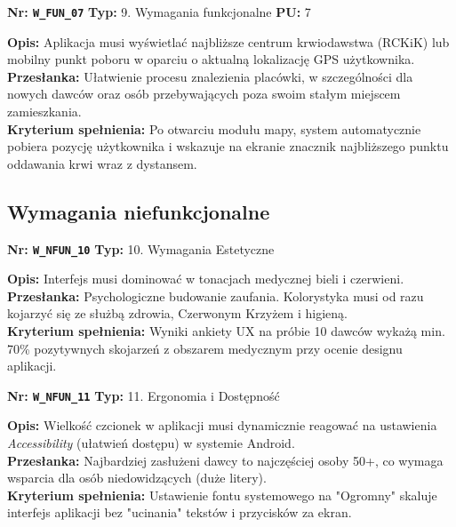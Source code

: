 \documentclass[11pt, a4paper]{article}
\newcommand{\req}[1]{\texttt{#1}}
\begin{document}
\begin{mdframed}[style=reqheader]
  \textbf{Nr: \req{W\_FUN\_07}} \hfill \textbf{Typ:} 9. Wymagania funkcjonalne \hfill \textbf{PU:} 7
\end{mdframed}
\begin{mdframed}[style=reqcard]
  \textbf{Opis:} Aplikacja musi wyświetlać najbliższe centrum krwiodawstwa (RCKiK) lub mobilny punkt poboru w oparciu o aktualną lokalizację GPS użytkownika. \\
  \textbf{Przesłanka:} Ułatwienie procesu znalezienia placówki, w szczególności dla nowych dawców oraz osób przebywających poza swoim stałym miejscem zamieszkania. \\
  \textbf{Kryterium spełnienia:} Po otwarciu modułu mapy, system automatycznie pobiera pozycję użytkownika i wskazuje na ekranie znacznik najbliższego punktu oddawania krwi wraz z dystansem.
\end{mdframed}

\subsection{Wymagania niefunkcjonalne}

\begin{mdframed}[style=reqheader]
  \textbf{Nr: \req{W\_NFUN\_10}} \hfill \textbf{Typ:} 10. Wymagania Estetyczne
\end{mdframed}
\begin{mdframed}[style=reqcard]
  \textbf{Opis:} Interfejs musi dominować w tonacjach medycznej bieli i czerwieni. \\
  \textbf{Przesłanka:} Psychologiczne budowanie zaufania. Kolorystyka musi od razu kojarzyć się ze służbą zdrowia, Czerwonym Krzyżem i higieną. \\
  \textbf{Kryterium spełnienia:} Wyniki ankiety UX na próbie 10 dawców wykażą min. 70\% pozytywnych skojarzeń z obszarem medycznym przy ocenie designu aplikacji.
\end{mdframed}

\begin{mdframed}[style=reqheader]
  \textbf{Nr: \req{W\_NFUN\_11}} \hfill \textbf{Typ:} 11. Ergonomia i Dostępność
\end{mdframed}
\begin{mdframed}[style=reqcard]
  \textbf{Opis:} Wielkość czcionek w aplikacji musi dynamicznie reagować na ustawienia \textit{Accessibility} (ułatwień dostępu) w systemie Android. \\
  \textbf{Przesłanka:} Najbardziej zasłużeni dawcy to najczęściej osoby 50+, co wymaga wsparcia dla osób niedowidzących (duże litery). \\
  \textbf{Kryterium spełnienia:} Ustawienie fontu systemowego na "Ogromny" skaluje interfejs aplikacji bez "ucinania" tekstów i przycisków za ekran.
\end{mdframed}
\end{document}
